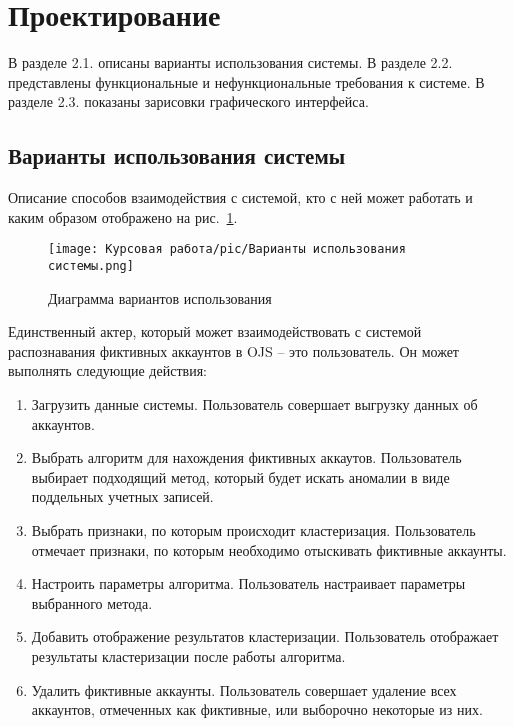 \newpage
\section{Проектирование}
\label{sec:designing}
В разделе 2.1. описаны варианты использования системы. В разделе 2.2. представлены функциональные и нефункциональные требования к системе. В разделе 2.3. показаны зарисовки графического интерфейса.

\vspace{1.5em}
\subsection{Варианты использования системы}
\label{subsec:Variants}
Описание способов взаимодействия с системой, кто с ней может работать и каким образом отображено на рис.~\ref{ris:variantsUse}.

\begin{figure}[!ht]
    \texttt{[image: Курсовая работа/pic/Варианты использования системы.png]}
    \medskip
    \caption{Диаграмма вариантов использования}
    \label{ris:variantsUse}
\end{figure}

Единственный актер, который может взаимодействовать с системой распознавания фиктивных аккаунтов в OJS – это пользователь. Он может выполнять следующие действия:

\begin{enumerate}
    \item Загрузить данные системы. Пользователь совершает выгрузку данных об аккаунтов.
    \item Выбрать алгоритм для нахождения фиктивных аккаутов. Пользователь выбирает подходящий метод, который будет искать аномалии в виде поддельных учетных записей.
    \item Выбрать признаки, по которым происходит кластеризация. Пользователь отмечает признаки, по которым необходимо отыскивать фиктивные аккаунты.
    \item Настроить параметры алгоритма. Пользователь настраивает параметры выбранного метода.
    \item Добавить отображение результатов кластеризации. Пользователь отображает результаты кластеризации после работы алгоритма.
    \item Удалить фиктивные аккаунты. Пользователь совершает удаление всех аккаунтов, отмеченных как фиктивные, или выборочно некоторые из них.
\end{enumerate}

